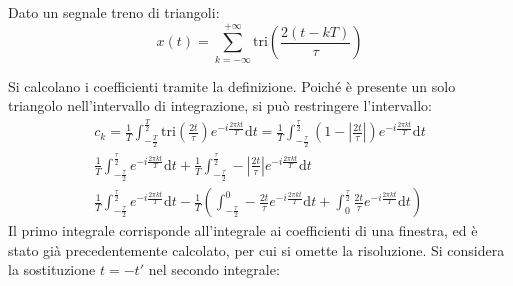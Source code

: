 \documentclass{article}
\newcommand{\df}{\mathrm{d}}
\begin{document}
Dato un segnale treno di triangoli:
\begin{equation*}
    x(t)=\displaystyle\sum_{k=-\infty}^{+\infty}\mbox{tri}\left(\frac{2(t-kT)}{\tau}\right)
\end{equation*}
\begin{center}
\end{center}
Si calcolano i coefficienti tramite la definizione. Poiché è presente un solo triangolo nell'intervallo di integrazione, si può restringere l'intervallo: 
\begin{gather*}
    c_k=\displaystyle\frac{1}{T}\int_{-\frac{T}{2}}^{\frac{T}{2}}\mbox{tri}\left(\frac{2t}{\tau}\right)e^{-i\frac{2\pi kt}{T}}\df t=\frac{1}{T}\int_{-\frac{\tau}{2}}^{\frac{\tau}{2}}\left(1-\left|\frac{2t}{\tau}\right|\right)e^{-i\frac{2\pi kt}{T}}\df t\\
    \displaystyle\frac{1}{T}\int_{-\frac{\tau}{2}}^{\frac{\tau}{2}}e^{-i\frac{2\pi kt}{T}}\df t+\frac{1}{T}\int_{-\frac{\tau}{2}}^{\frac{\tau}{2}}-\left|\frac{2t}{\tau}\right|e^{-i\frac{2\pi kt}{T}}\df t\\
    \displaystyle\frac{1}{T}\int_{-\frac{\tau}{2}}^{\frac{\tau}{2}}e^{-i\frac{2\pi kt}{T}}\df t-\frac{1}{T}\left(\int_{-\frac{\tau}{2}}^{0}-\frac{2t}{\tau}e^{-i\frac{2\pi kt}{T}}\df t+\int_{0}^{\frac{\tau}{2}}\frac{2t}{\tau}e^{-i\frac{2\pi kt}{T}}\df t\right)
\end{gather*}
Il primo integrale corrisponde all'integrale ai coefficienti di una finestra, ed è stato già precedentemente calcolato, per cui si omette la risoluzione. Si considera la 
sostituzione $t=-t'$ nel secondo integrale:
\end{document}
